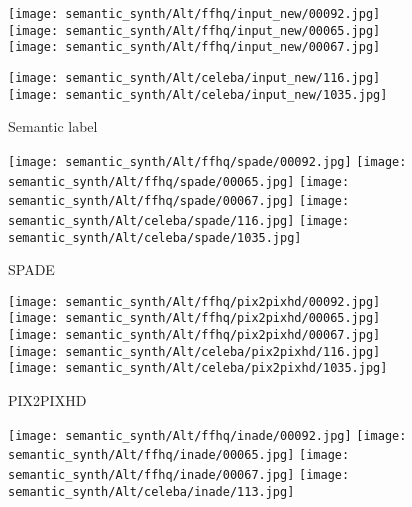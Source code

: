 \documentclass[10pt,twocolumn,letterpaper]{article}
\begin{document}
\begin{figure*}[t!]
    \centering
    \begin{subfigure}[t]{0.137\linewidth}
      \captionsetup{justification=centering, labelformat=empty, font=scriptsize}
\texttt{[image: semantic\_synth/Alt/ffhq/input\_new/00092.jpg]}
   \texttt{[image: semantic\_synth/Alt/ffhq/input\_new/00065.jpg]}
      \texttt{[image: semantic\_synth/Alt/ffhq/input\_new/00067.jpg]}
      
\texttt{[image: semantic\_synth/Alt/celeba/input\_new/116.jpg]}
      \texttt{[image: semantic\_synth/Alt/celeba/input\_new/1035.jpg]}
      \caption{Semantic label}
    \end{subfigure}
    \begin{subfigure}[t]{0.137\linewidth}
      \captionsetup{justification=centering, labelformat=empty, font=scriptsize}
\texttt{[image: semantic\_synth/Alt/ffhq/spade/00092.jpg]}
   \texttt{[image: semantic\_synth/Alt/ffhq/spade/00065.jpg]}
      \texttt{[image: semantic\_synth/Alt/ffhq/spade/00067.jpg]}   
\texttt{[image: semantic\_synth/Alt/celeba/spade/116.jpg]}
      \texttt{[image: semantic\_synth/Alt/celeba/spade/1035.jpg]}
      \caption{SPADE\cite{park2019SPADE}}
    \end{subfigure}
    \begin{subfigure}[t]{0.137\linewidth}
      \captionsetup{justification=centering, labelformat=empty, font=scriptsize}
\texttt{[image: semantic\_synth/Alt/ffhq/pix2pixhd/00092.jpg]}
\texttt{[image: semantic\_synth/Alt/ffhq/pix2pixhd/00065.jpg]}
      \texttt{[image: semantic\_synth/Alt/ffhq/pix2pixhd/00067.jpg]}
\texttt{[image: semantic\_synth/Alt/celeba/pix2pixhd/116.jpg]}
      \texttt{[image: semantic\_synth/Alt/celeba/pix2pixhd/1035.jpg]}
      \caption{PIX2PIXHD\cite{wang2018pix2pixHD}}
    \end{subfigure}
    \begin{subfigure}[t]{0.137\linewidth}
      \captionsetup{justification=centering, labelformat=empty, font=scriptsize}
\texttt{[image: semantic\_synth/Alt/ffhq/inade/00092.jpg]}
   \texttt{[image: semantic\_synth/Alt/ffhq/inade/00065.jpg]}
      \texttt{[image: semantic\_synth/Alt/ffhq/inade/00067.jpg]}
         \texttt{[image: semantic\_synth/Alt/celeba/inade/113.jpg]}

\end{subfigure}
\end{figure*}
\end{document}
